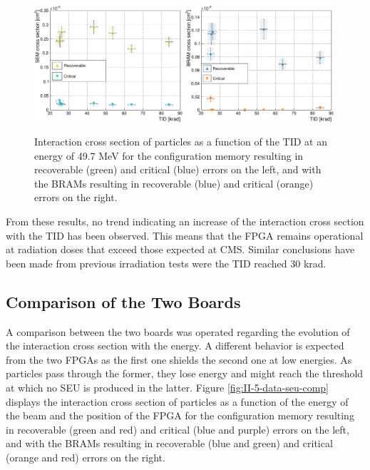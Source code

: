       \begin{figure}[h!]
        \centering
        \includegraphics[width=0.49\textwidth]{img/plots/cDose_SEM-crop}
        \includegraphics[width=0.49\textwidth]{img/plots/cDose_BRAM-crop}
        \caption{Interaction cross section of particles as a function of the TID at an energy of 49.7 MeV for the configuration memory resulting in recoverable (green) and critical (blue) errors on the left, and with the BRAMs resulting in recoverable (blue) and critical (orange) errors on the right.}
        \label{fig:II-5-data-seu-tid}
      \end{figure}

      From these results, no trend indicating an increase of the interaction cross section with the TID has been observed. This means that the FPGA remains operational at radiation doses that exceed those expected at CMS. Similar conclusions have been made from previous irradiation tests \cite{Bylsma2013242} were the TID reached 30 krad.

    \subsection{Comparison of the Two Boards}

      A comparison between the two boards was operated regarding the evolution of the interaction cross section with the energy. A different behavior is expected from the two FPGAs as the first one shields the second one at low energies. As particles pass through the former, they lose energy and might reach the threshold at which no SEU is produced in the latter. Figure \ref{fig:II-5-data-seu-comp} displays the interaction cross section of particles as a function of the energy of the beam and the position of the FPGA for the configuration memory resulting in recoverable (green and red) and critical (blue and purple) errors on the left, and with the BRAMs resulting in recoverable (blue and green) and critical (orange and red) errors on the right. \\

